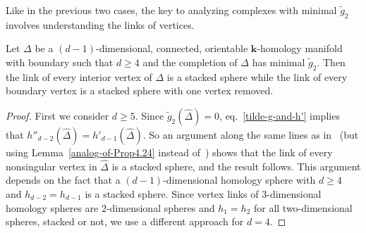 \documentclass[ALCO,ThmDefs,Unicode,epreuves]{cedram}
\newcommand{\complet}[1]{\hat{#1}}
\newcommand{\field}{\mathbf{k}}
\begin{document}
 Like in the previous two cases, the key to analyzing complexes with minimal $\tilde{g}_2$ involves understanding the links of vertices. 
 
 \begin{prop} \label{links of minimal tilde_g}
 Let $\Delta$ be a $(d-1)$-dimensional, connected, orientable $\field$-homology manifold with boundary such that $d \ge 4$ and the completion of $\Delta$ has minimal $\tilde{g}_2.$ Then the link of every interior vertex of $\Delta$ is a stacked sphere while the link of every boundary vertex is a stacked sphere with one vertex removed.
 \end{prop} 
 
 \begin{proof}
 First we consider $d \ge 5.$ Since $\tilde{g}_2(\complet{\Delta})=0$, eq.~\eqref{tilde-g-and-h'} implies that $h''_{d-2}(\complet{\Delta}) = h'_{d-1}(\complet{\Delta}).$ So an argument along the same lines as in~\cite[Theorem~5.2]{Novik-Swartz-09:Socles} (but using Lemma~\ref{analog-of-Prop4.24} instead of~\cite[Proposition~4.24]{Swartz-09}) shows that the link of every nonsingular vertex in $\complet{\Delta}$ is a stacked sphere, and the result follows. This argument depends on the fact that a $(d-1)$-dimensional homology sphere with $d \ge 4$ and $h_{d-2}=h_{d-1}$ is a stacked sphere. Since vertex links of $3$-dimensional homology spheres are $2$-dimensional spheres and $h_1=h_2$ for all two-dimensional spheres, stacked or not, we use a different approach for $d=4.$
 

\end{proof}
\end{document}
